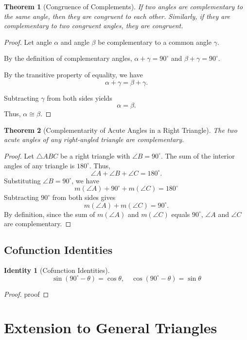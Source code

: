 \documentclass{article}
\theoremstyle{definition}
\theoremstyle{plain}
\newtheorem{theorem}{Theorem}[]
\newtheorem{identity}{Identity}[]
\begin{document}
\begin{theorem}[Congruence of Complements]
    If two angles are complementary to the same angle, then they are congruent to each other. Similarly, if they are complementary to two congruent angles, they are congruent.
\end{theorem}
\begin{proof}
    Let angle $\alpha$ and angle $\beta$ be complementary to a common angle $\gamma$.

    By the definition of complementary angles, $\alpha + \gamma = 90^\circ$ and $\beta + \gamma = 90^\circ$.

    By the transitive property of equality, we have
    \[
    \alpha + \gamma = \beta + \gamma.
    \]
    
    Subtracting $\gamma$ from both sides yields
    \[
    \alpha = \beta.
    \]
    Thus, $\alpha \cong \beta$.
\end{proof}

\begin{theorem}[Complementarity of Acute Angles in a Right Triangle]
    The two acute angles of any right-angled triangle are complementary.
\end{theorem}
\begin{proof}
    Let $\triangle ABC$ be a right triangle with $\angle B = 90^\circ$. The sum of the interior angles of any triangle is $180^\circ$. Thus,
    \[
    \angle A + \angle B + \angle C = 180^\circ.
    \]
    Substituting $\angle B = 90^\circ$, we have
    \[
    m(\angle A) + 90^\circ + m(\angle C) = 180^\circ
    \]
    Subtracting $90^\circ$ from both sides gives
    \[
    m(\angle A) + m(\angle C) = 90^\circ.
    \]
    By definition, since the sum of $m(\angle A)$ and $m(\angle C)$ equals $90^\circ$, $\angle A$ and $\angle C$ are complementary.
\end{proof}

\subsection{Cofunction Identities}

\begin{identity}[Cofunction Identities]
    \[
    \sin(90^\circ - \theta) = \cos \theta, \quad \cos(90^\circ - \theta) = \sin \theta
    \]
\end{identity}
\begin{proof}
    proof
\end{proof}

\section{Extension to General Triangles}
\end{document}
